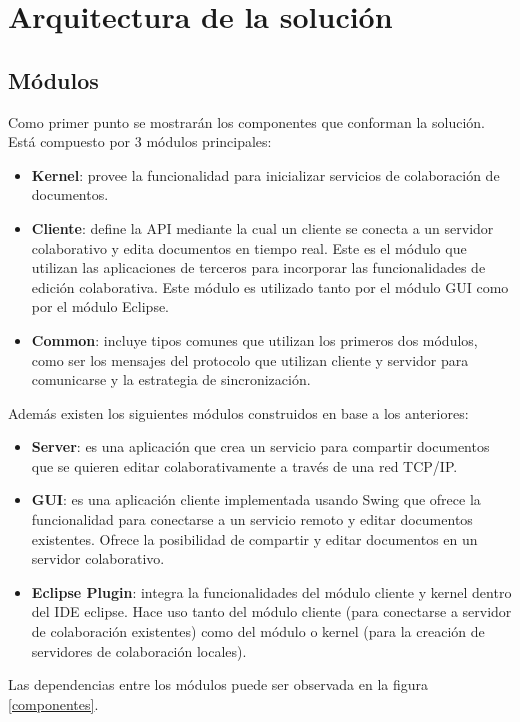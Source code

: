 \documentclass[12pt,a4paper]{article}
\begin{document}
\section{Arquitectura de la solución}

\subsection{Módulos}

Como primer punto se mostrarán los componentes que conforman la solución. Está compuesto por 3 módulos principales:

\begin{itemize}
	\item \textbf{Kernel}: provee la funcionalidad para inicializar servicios de colaboración de documentos.
	\item \textbf{Cliente}: define la API mediante la cual un cliente se conecta a un servidor colaborativo 
	y edita documentos
	en tiempo real. Este es el módulo que utilizan las aplicaciones de terceros para incorporar las funcionalidades
	de 	edición colaborativa. Este módulo es utilizado tanto por el módulo GUI como por el módulo Eclipse.
	\item \textbf{Common}: incluye tipos comunes que utilizan los primeros dos módulos, como ser los mensajes
	del protocolo que utilizan cliente y servidor para comunicarse y la estrategia de sincronización.
\end{itemize}


Además existen los siguientes módulos construidos en base a los anteriores:
\begin{itemize}
	\item \textbf{Server}: es una aplicación que crea un servicio para compartir documentos que se quieren
	editar colaborativamente a través de una red TCP/IP.
	\item \textbf{GUI}: es una aplicación cliente implementada usando Swing que ofrece la funcionalidad
	para conectarse a un servicio remoto y editar documentos existentes. Ofrece la posibilidad de compartir
	y editar documentos	en un servidor colaborativo.
	\item \textbf{Eclipse Plugin}: integra la funcionalidades del módulo cliente y kernel dentro del IDE eclipse.
	Hace uso tanto del módulo cliente (para conectarse a servidor de colaboración existentes) como del módulo
	o kernel (para la creación de servidores de colaboración locales).
\end{itemize}

Las dependencias entre los módulos puede ser observada en la figura \ref{componentes}.
\end{document}
